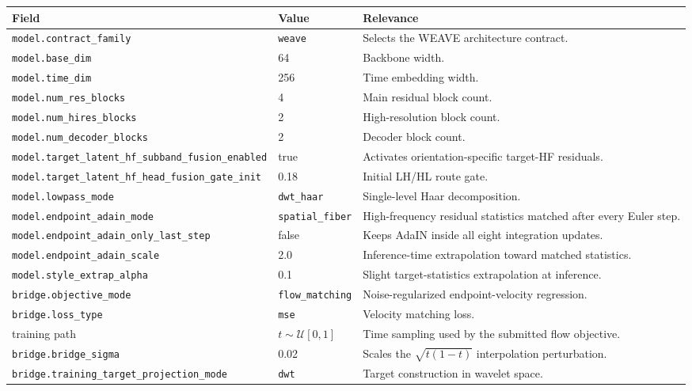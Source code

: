\documentclass[10pt,twocolumn]{article}
\begin{document}
\begin{table}[t]
\centering
\footnotesize
\begin{tabularx}{\textwidth}{p{}p{}X}
\toprule
Field & Value & Relevance \\
\midrule
\texttt{model.contract\_family} & \texttt{weave} & Selects the WEAVE architecture contract. \\
\texttt{model.base\_dim} & 64 & Backbone width. \\
\texttt{model.time\_dim} & 256 & Time embedding width. \\
\texttt{model.num\_res\_blocks} & 4 & Main residual block count. \\
\texttt{model.num\_hires\_blocks} & 2 & High-resolution block count. \\
\texttt{model.num\_decoder\_blocks} & 2 & Decoder block count. \\
\texttt{model.target\_latent\_hf\_subband\_fusion\_enabled} & true & Activates orientation-specific target-HF residuals. \\
\texttt{model.target\_latent\_hf\_head\_fusion\_gate\_init} & 0.18 & Initial LH/HL route gate. \\
\texttt{model.lowpass\_mode} & \texttt{dwt\_haar} & Single-level Haar decomposition. \\
\texttt{model.endpoint\_adain\_mode} & \texttt{spatial\_fiber} & High-frequency residual statistics matched after every Euler step. \\
\texttt{model.endpoint\_adain\_only\_last\_step} & false & Keeps AdaIN inside all eight integration updates. \\
\texttt{model.endpoint\_adain\_scale} & 2.0 & Inference-time extrapolation toward matched statistics. \\
\texttt{model.style\_extrap\_alpha} & 0.1 & Slight target-statistics extrapolation at inference. \\
\texttt{bridge.objective\_mode} & \texttt{flow\_matching} & Noise-regularized endpoint-velocity regression. \\
\texttt{bridge.loss\_type} & \texttt{mse} & Velocity matching loss. \\
training path & $t\sim\mathcal U[0,1]$ & Time sampling used by the submitted flow objective. \\
\texttt{bridge.bridge\_sigma} & 0.02 & Scales the $\sqrt{t(1-t)}$ interpolation perturbation. \\
\texttt{bridge.training\_target\_projection\_mode} & \texttt{dwt} & Target construction in wavelet space. \\

\end{tabularx}
\end{table}
\end{document}
